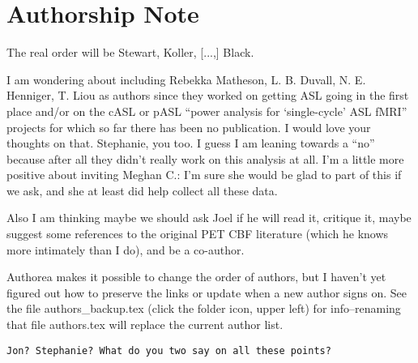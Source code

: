 \section*{Authorship Note}
The real order will be Stewart, Koller, [...,] Black.

I am wondering about including Rebekka Matheson, L. B. Duvall, N. E. Henniger, T. Liou as authors since they worked on getting ASL going in the first place and/or on the cASL or pASL ``power analysis for `single-cycle' ASL fMRI'' projects for which so far there has been no publication. I would love your thoughts on that. Stephanie, you too. I guess I am leaning towards a ``no'' because after all they didn't really work on this analysis at all. I'm a little more positive about inviting Meghan C.: I'm sure she would be glad to part of this if we ask, and she at least did help collect all these data. 

Also I am thinking maybe we should ask Joel if he will read it, critique it, maybe suggest some references to the original PET CBF literature (which he knows more intimately than I do), and be a co-author. 

Authorea makes it possible to change the order of authors, but I haven't yet figured out how to preserve the links or update when a new author signs on. See the file authors\_backup.tex (click the folder icon, upper left) for info--renaming that file authors.tex will replace the current author list.

\verb|Jon? Stephanie? What do you two say on all these points?|